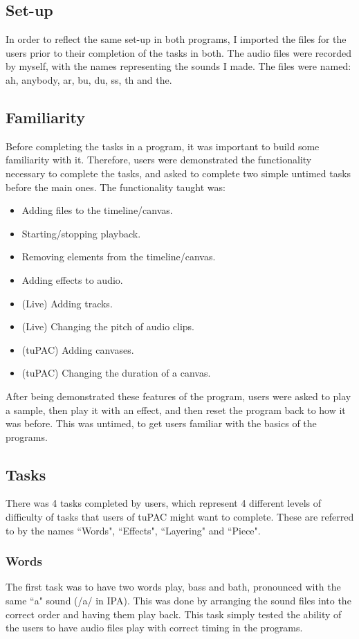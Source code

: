 \documentclass[12pt,a4paper,oneside,openright]{report}
\begin{document}
\subsection{Set-up}
In order to reflect the same set-up in both programs, I imported the files for the users prior to their completion of the tasks in both. The audio files were recorded by myself, with the names representing the sounds I made. The files were named: ah, anybody, ar, bu, du, ss, th and the.

\subsection{Familiarity}
Before completing the tasks in a program, it was important to build some familiarity with it. Therefore, users were demonstrated the functionality necessary to complete the tasks, and asked to complete two simple untimed tasks before the main ones. The functionality taught was:
\begin{itemize}
    \item Adding files to the timeline/canvas.
    \item Starting/stopping playback.
    \item Removing elements from the timeline/canvas.
    \item Adding effects to audio.
    \item (Live) Adding tracks.
    \item (Live) Changing the pitch of audio clips.
    \item (tuPAC) Adding canvases.
    \item (tuPAC) Changing the duration of a canvas.
\end{itemize}

After being demonstrated these features of the program, users were asked to play a sample, then play it with an effect, and then reset the program back to how it was before. This was untimed, to get users familiar with the basics of the programs.

\subsection{Tasks}
There was 4 tasks completed by users, which represent 4 different levels of difficulty of tasks that users of tuPAC might want to complete. These are referred to by the names ``Words", ``Effects", ``Layering" and ``Piece".

\subsubsection{Words}
The first task was to have two words play, bass and bath, pronounced with the same ``a" sound (/a/ in IPA). This was done by arranging the sound files into the correct order and having them play back. This task simply tested the ability of the users to have audio files play with correct timing in the programs.
\end{document}
